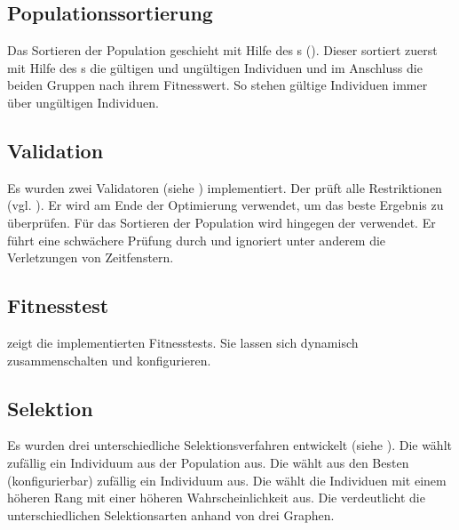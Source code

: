 \newpage
\subsection{Populationssortierung}
Das Sortieren der Population geschieht mit Hilfe des s (). Dieser sortiert zuerst mit Hilfe des s die gültigen und ungültigen Individuen und im Anschluss die beiden Gruppen nach ihrem Fitnesswert. So stehen gültige Individuen immer über ungültigen Individuen.

\subsection{Validation}
Es wurden zwei Validatoren (siehe ) implementiert. Der  prüft alle Restriktionen (vgl. ). Er wird am Ende der Optimierung verwendet, um das beste Ergebnis zu überprüfen. Für das Sortieren der Population wird hingegen der  verwendet. Er führt eine schwächere Prüfung durch und ignoriert unter anderem die Verletzungen von Zeitfenstern.

\newpage
\subsection{Fitnesstest}
 zeigt die implementierten Fitnesstests. Sie lassen sich dynamisch zusammenschalten und konfigurieren.

\subsection{Selektion}
Es wurden drei unterschiedliche Selektionsverfahren entwickelt (siehe ). Die  wählt zufällig ein Individuum aus der Population aus. Die  wählt aus den Besten (konfigurierbar) zufällig ein Individuum aus. Die  wählt die Individuen mit einem höheren Rang mit einer höheren Wahrscheinlichkeit aus. Die  verdeutlicht die unterschiedlichen Selektionsarten anhand von drei Graphen.

